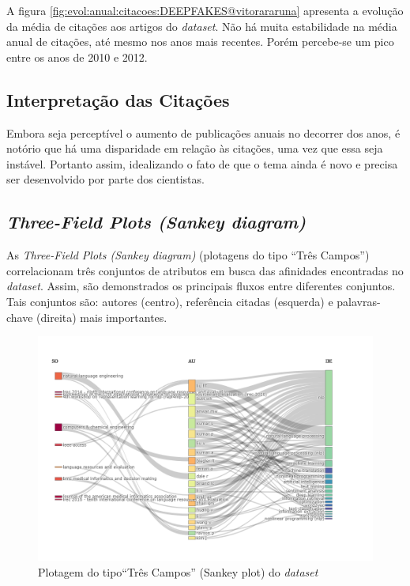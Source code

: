 A figura \ref{fig:evol:anual:citacoes:DEEPFAKES@vitorararuna} apresenta a evolução da média de citações aos artigos do \textit{dataset}. Não há muita estabilidade na média anual de citações, até mesmo nos anos mais recentes. Porém percebe-se um pico entre os anos de 2010 e 2012.

\subsection{Interpretação das Citações}
Embora seja perceptível o aumento de publicações anuais no decorrer dos anos, é notório que há uma disparidade em relação às citações, uma vez que essa seja instável. Portanto assim, idealizando o fato de que o tema ainda é novo e precisa ser desenvolvido por parte dos cientistas.

\subsection{\textit{Three-Field Plots (Sankey diagram)}}

As \textit{Three-Field Plots (Sankey diagram)} (plotagens do tipo ``Três Campos'') correlacionam três conjuntos de atributos em busca das afinidades encontradas no \textit{dataset}. Assim, são demonstrados os principais fluxos entre diferentes conjuntos. Tais conjuntos são: autores (centro), referência citadas (esquerda) e palavras-chave (direita) mais importantes.


\begin{figure}
    \centering
    \includegraphics[width=1\textwidth]{experiments/vitorararuna/3C.png}
    \caption{Plotagem do tipo``Três Campos'' (Sankey plot) do \textit{dataset}}
    \label{fig:DEEPFAKES@vitorararuna:3c}
\end{figure}

